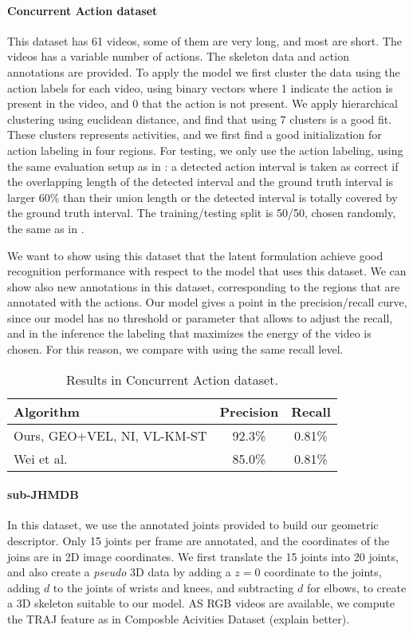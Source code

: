 \paragraph{Concurrent Action dataset} This dataset has 61 videos, some of them are very long, and most are short. The videos has a variable number of actions. The skeleton data and action annotations are provided. To apply the model we first cluster the data using the action labels for each video, using binary vectors where 1 indicate the action is present in the video, and 0 that the action is not present. We apply hierarchical clustering using euclidean distance, and find that using 7 clusters is a good fit. These clusters represents activities, and we first find a good initialization for action labeling in four regions. For testing, we only use the action labeling, using the same evaluation setup as in \cite{Wei2013}: a detected action interval is taken as correct if the overlapping length of the detected interval and the ground truth interval is larger 60\% than their union length or the detected interval is totally covered by the ground truth interval. The training/testing split is 50/50, chosen randomly, the same as in \cite{Wei2013}.

We want to show using this dataset that the latent formulation achieve good recognition performance with respect to the model that uses this dataset. We can show also new annotations in this dataset, corresponding to the regions that are annotated with the actions. Our model gives a point in the precision/recall curve, since our model has no threshold or parameter that allows to adjust the recall, and in the  inference the labeling that maximizes the energy of the video is chosen. For this reason, we compare with \cite{Wei2013} using the same recall level.

\begin{table}
\centering
\begin{tabular}{|l|c|c|}
\hline
\textbf{Algorithm} & \textbf{Precision} & \textbf{Recall}\\
\hline
Ours, GEO+VEL, NI, VL-KM-ST &  92.3\% & 0.81\% \\
\hline
Wei et al. \cite{Wei2013} & 85.0\% & 0.81\% \\
\hline
\end{tabular}
\caption{Results in Concurrent Action dataset. }
\end{table}
  
 \paragraph{sub-JHMDB} In this dataset, we use the annotated joints provided to build our geometric descriptor. Only 15 joints per frame are annotated, and the coordinates of the joins are in 2D image coordinates. We first translate the 15 joints into 20 joints, and also create a \emph{pseudo} 3D data by adding a $z=0$ coordinate to the joints, adding $d$ to the joints of wrists and knees, and subtracting $d$ for elbows, to create a 3D skeleton suitable to our model. AS RGB videos are available, we compute the TRAJ feature as in Composble Acivities Dataset (explain better).

